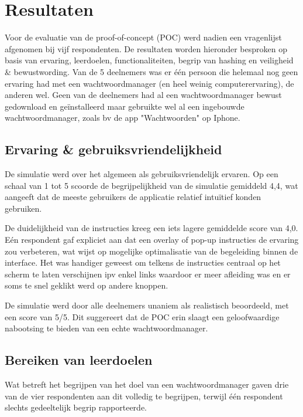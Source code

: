 \chapter{Resultaten}

Voor de evaluatie van de proof-of-concept (POC) werd nadien een vragenlijst afgenomen bij vijf respondenten. De resultaten worden hieronder besproken op basis van ervaring, leerdoelen, functionaliteiten, begrip van hashing en veiligheid \& bewustwording.
Van de 5 deelnemers was er één persoon die helemaal nog geen ervaring had met een wachtwoordmanager (en heel weinig computerervaring), de anderen wel. Geen van de deelnemers had al een wachtwoordmanager bewust gedownload en geïnstalleerd maar gebruikte wel al een ingebouwde wachtwoordmanager, zoals bv de app "Wachtwoorden" op Iphone.

\section{Ervaring \& gebruiksvriendelijkheid}

De simulatie werd over het algemeen als gebruiksvriendelijk ervaren. Op een schaal van 1 tot 5 scoorde de begrijpelijkheid van de simulatie gemiddeld 4,4, wat aangeeft dat de meeste gebruikers de applicatie relatief intuïtief konden gebruiken.

De duidelijkheid van de instructies kreeg een iets lagere gemiddelde score van 4,0. Eén respondent gaf expliciet aan dat een overlay of pop-up instructies de ervaring zou verbeteren, wat wijst op mogelijke optimalisatie van de begeleiding binnen de interface. Het was handiger geweest om telkens de instructies centraal op het scherm te laten verschijnen ipv enkel links waardoor er meer afleiding was en er soms te snel geklikt werd op andere knoppen.

De simulatie werd door alle deelnemers unaniem als realistisch beoordeeld, met een score van 5/5. Dit suggereert dat de POC erin slaagt een geloofwaardige nabootsing te bieden van een echte wachtwoordmanager.

\section{Bereiken van leerdoelen}

Wat betreft het begrijpen van het doel van een wachtwoordmanager gaven drie van de vier respondenten aan dit volledig te begrijpen, terwijl één respondent slechts gedeeltelijk begrip rapporteerde.

